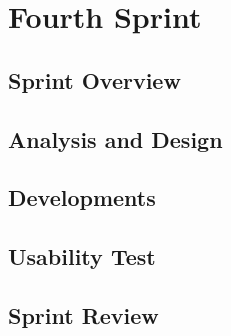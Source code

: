 \chapter{Fourth Sprint}
\section{Sprint Overview}


\section{Analysis and Design}


\section{Developments}


\section{Usability Test}


\section{Sprint Review}
